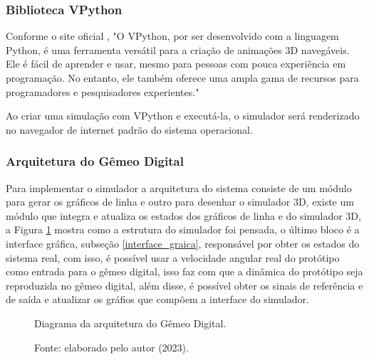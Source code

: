 \newpage
\subsubsection{Biblioteca VPython}

Conforme o site oficial \cite{vpython}, "O VPython, por ser desenvolvido com a linguagem Python, é uma ferramenta versátil para a criação de animações 3D navegáveis. Ele é fácil de aprender e usar, mesmo para pessoas com pouca experiência em programação. No entanto, ele também oferece uma ampla gama de recursos para programadores e pesquisadores experientes."

Ao criar uma simulação com VPython e executá-la, o simulador será renderizado no navegador de internet padrão do sistema operacional.


\subsubsection{Arquitetura do Gêmeo Digital}

Para implementar o simulador a arquitetura do sistema consiste de um módulo para gerar os gráficos de linha e outro para desenhar o simulador 3D, existe um módulo que integra e atualiza os estados dos gráficos de linha e do simulador 3D, a Figura \ref{fig3:image_13} mostra como a estrutura do simulador foi pensada, o último bloco é a interface gráfica, subseção \ref{interface_graica}, responsável por obter os estados do sistema real, com isso, é possível usar a velocidade angular real do protótipo como entrada para o gêmeo digital, isso faz com que a dinâmica do protótipo seja reproduzida no gêmeo digital, além disse, é possível obter os sinais de referência e de saída e atualizar os gráfios que compõem a interface do simulador.

\begin{figure}[!h]
	\centering
	\caption{Diagrama da arquitetura do Gêmeo Digital.}
        \vspace{0.2cm}
	\caption*{Fonte: elaborado pelo autor (2023).}
	\label{fig3:image_13}
\end{figure}


